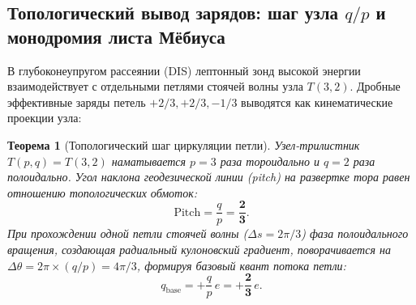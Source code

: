 \documentclass[11pt,a4paper]{article}
\newtheorem{theorem}{Теорема}
\theoremstyle{definition}
\theoremstyle{remark}
\begin{document}
\subsection{Топологический вывод зарядов: шаг узла $q/p$ и монодромия листа Мёбиуса}

В глубоконеупругом рассеянии (DIS) лептонный зонд высокой энергии взаимодействует с отдельными петлями стоячей волны узла $T(3,2)$. Дробные эффективные заряды петель $+2/3, +2/3, -1/3$ выводятся как кинематические проекции узла:

\begin{theorem}[Топологический шаг циркуляции петли]
\label{thm:quark_charges_derivation}
Узел-трилистник $T(p,q) = T(3,2)$ наматывается $p=3$ раза тороидально и $q=2$ раза полоидально. Угол наклона геодезической линии (pitch) на развертке тора равен отношению топологических обмоток:
\begin{equation}
    \text{Pitch} = \frac{q}{p} = \frac{\mathbf{2}}{\mathbf{3}}.
    \label{eq:knot_pitch_two_thirds}
\end{equation}
При прохождении одной петли стоячей волны ($\Delta s = 2\pi/3$) фаза полоидального вращения, создающая радиальный кулоновский градиент, поворачивается на $\Delta\theta = 2\pi \times (q/p) = 4\pi/3$, формируя базовый квант потока петли:
\begin{equation}
    q_{\mathrm{base}} = +\frac{q}{p} \, e = +\frac{\mathbf{2}}{\mathbf{3}} \, e.
\end{equation}
\end{theorem}
\end{document}
